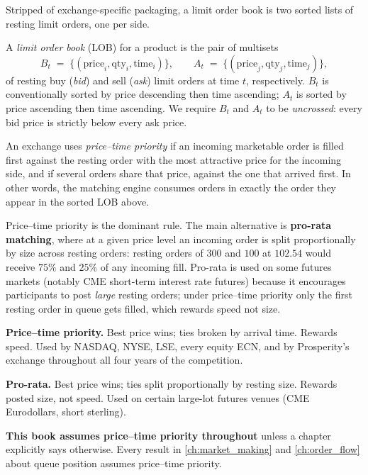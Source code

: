 Stripped of exchange-specific packaging, a limit order book is two
sorted lists of resting limit orders, one per side.

\begin{definition}
A \emph{limit order book} (LOB) for a product is the pair of
multisets
\[
  B_t \;=\; \{(\mathrm{price}_i, \mathrm{qty}_i, \mathrm{time}_i)\},
  \qquad
  A_t \;=\; \{(\mathrm{price}_j, \mathrm{qty}_j, \mathrm{time}_j)\},
\]
of resting buy (\emph{bid}) and sell (\emph{ask}) limit orders at time
$t$, respectively. $B_t$ is conventionally sorted by price descending
then time ascending; $A_t$ is sorted by price ascending then time
ascending. We require $B_t$ and $A_t$ to be \emph{uncrossed}: every
bid price is strictly below every ask price.
\end{definition}

\begin{definition}
An exchange uses \emph{price--time priority} if an incoming marketable
order is filled first against the resting order with the most
attractive price for the incoming side, and if several orders share
that price, against the one that arrived first. In other words, the
matching engine consumes orders in exactly the order they appear in
the sorted LOB above.
\end{definition}

Price--time priority is the dominant rule. The main alternative is
\textbf{pro-rata matching}, where at a given price level an incoming
order is split proportionally by size across resting orders: resting
orders of $300$ and $100$ at $102.54$ would receive $75\%$ and $25\%$
of any incoming fill. Pro-rata is used on some futures markets
(notably CME short-term interest rate futures) because it encourages
participants to post \emph{large} resting orders; under price--time
priority only the first resting order in queue gets filled, which
rewards speed not size.

\begin{keyfactbox}
\textbf{Price--time priority.} Best price wins; ties broken by
arrival time. Rewards speed. Used by NASDAQ, NYSE, LSE, every equity
ECN, and by Prosperity's exchange throughout all four years of the
competition.

\vspace{0.4em}
\textbf{Pro-rata.} Best price wins; ties split proportionally by
resting size. Rewards posted size, not speed. Used on certain
large-lot futures venues (CME Eurodollars, short sterling).

\vspace{0.4em}
\textbf{This book assumes price--time priority throughout} unless a
chapter explicitly says otherwise. Every result in \cref{ch:market_making}
and \cref{ch:order_flow} about queue position assumes price--time
priority.
\end{keyfactbox}


